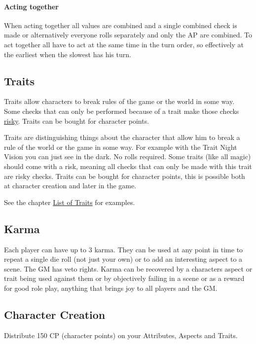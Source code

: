 \documentclass[11pt]{article}
\begin{document}
{\paragraph*{Acting together}
\label{sec:org9bba666}
When acting together all values are combined and a single combined check is made or alternatively everyone rolls separately and only the AP are combined. To act together all have to act at the same time in the turn order, so effectively at the earliest when the slowest has his turn.
\subsection{Traits}
\label{sec:orga3f5999}
\begin{short}
Traits allow characters to break rules of the game or the world in some way. Some checks that can only be performed because of a trait make those checks \hyperref[sec:org39f9888]{risky}. Traits can be bought for character points.
\end{short}

Traits are distinguishing things about the character that allow him to break a rule of the world or the game in some way. For example with the Trait Night Vision you can just see in the dark. No rolls required. Some traits (like all magic) should come with a risk, meaning all checks that can only be made with this trait are risky checks. Traits can be bought for character points, this is possible both at character creation and later in the game.

See the chapter \hyperref[sec:orgf709dd8]{List of Traits} for examples.
\subsection{Karma}
\label{sec:org577a8c9}
\begin{short}
Each player can have up to 3 karma. They can be used at any point in time to repeat a single die roll (not just your own) or to add an interesting aspect to a scene. The GM has veto rights. Karma can be recovered by a characters aspect or trait being used against them or by objectively failing in a scene or as a reward for good role play, anything that brings joy to all players and the GM. 
\end{short}
\subsection{Character Creation}
\label{sec:org9b155d4}
\begin{short}
Distribute 150 CP (character points) on your Attributes, Aspects and Traits.


\end{short}}
\end{document}
